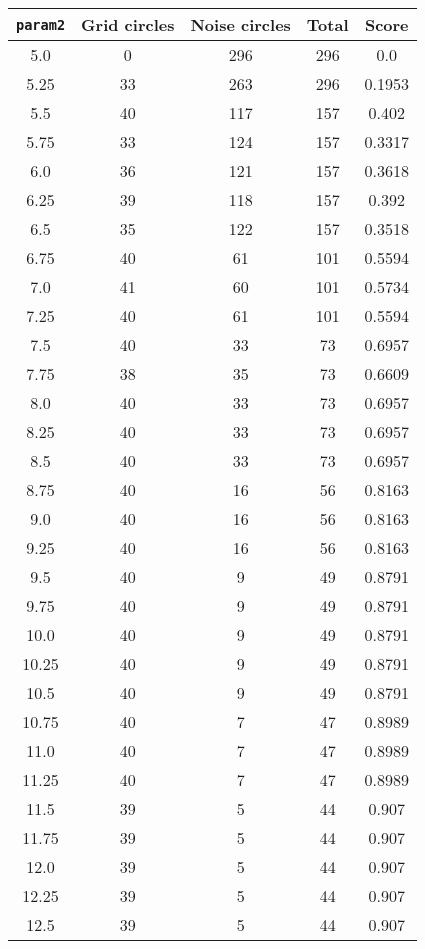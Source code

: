 \documentclass[letterpaper, 12pt]{article}
\begin{document}
\begin{longtable}{|c|c|c|c|c|}
\hline
\textbf{\texttt{param2}} & \textbf{Grid circles} & \textbf{Noise circles} & \textbf{Total} & \textbf{Score} \\
\hline
5.0 & 0 & 296 & 296 & 0.0 \\
\hline
5.25 & 33 & 263 & 296 & 0.1953 \\
\hline
5.5 & 40 & 117 & 157 & 0.402 \\
\hline
5.75 & 33 & 124 & 157 & 0.3317 \\
\hline
6.0 & 36 & 121 & 157 & 0.3618 \\
\hline
6.25 & 39 & 118 & 157 & 0.392 \\
\hline
6.5 & 35 & 122 & 157 & 0.3518 \\
\hline
6.75 & 40 & 61 & 101 & 0.5594 \\
\hline
7.0 & 41 & 60 & 101 & 0.5734 \\
\hline
7.25 & 40 & 61 & 101 & 0.5594 \\
\hline
7.5 & 40 & 33 & 73 & 0.6957 \\
\hline
7.75 & 38 & 35 & 73 & 0.6609 \\
\hline
8.0 & 40 & 33 & 73 & 0.6957 \\
\hline
8.25 & 40 & 33 & 73 & 0.6957 \\
\hline
8.5 & 40 & 33 & 73 & 0.6957 \\
\hline
8.75 & 40 & 16 & 56 & 0.8163 \\
\hline
9.0 & 40 & 16 & 56 & 0.8163 \\
\hline
9.25 & 40 & 16 & 56 & 0.8163 \\
\hline
9.5 & 40 & 9 & 49 & 0.8791 \\
\hline
9.75 & 40 & 9 & 49 & 0.8791 \\
\hline
10.0 & 40 & 9 & 49 & 0.8791 \\
\hline
10.25 & 40 & 9 & 49 & 0.8791 \\
\hline
10.5 & 40 & 9 & 49 & 0.8791 \\
\hline
10.75 & 40 & 7 & 47 & 0.8989 \\
\hline
11.0 & 40 & 7 & 47 & 0.8989 \\
\hline
11.25 & 40 & 7 & 47 & 0.8989 \\
\hline
11.5 & 39 & 5 & 44 & 0.907 \\
\hline
11.75 & 39 & 5 & 44 & 0.907 \\
\hline
12.0 & 39 & 5 & 44 & 0.907 \\
\hline
12.25 & 39 & 5 & 44 & 0.907 \\
\hline
12.5 & 39 & 5 & 44 & 0.907 \\

\end{longtable}
\end{document}
